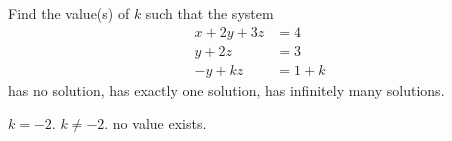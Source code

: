 
\begin{Exercise}[name={},
title={}, 
origin={\cite{MH}},
counter=Exercise]
Find the value(s) of $k$ such that the system
\[\begin{aligned}x+2y+3z&=4\\y+2z&=3\\-y+kz&=1+k\end{aligned}\]
\Question has no solution,
\Question has exactly one solution,
\Question has infinitely many solutions.
\end{Exercise}

\begin{Answer}
\begin{multicols}{2}
\Question $k=-2$.
\Question $k\neq -2$.
\Question no value exists.
\EndCurrentQuestion
\end{multicols}

\end{Answer}

